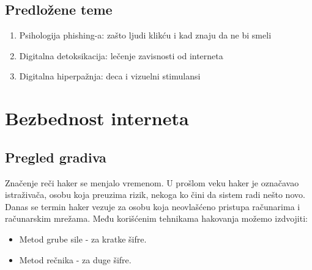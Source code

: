 \documentclass[12pt]{article}
\begin{document}
\subsection{Predložene teme}
\begin{enumerate}
    \item Psihologija phishing-a: zašto ljudi klikću i kad znaju da ne bi smeli
    \item Digitalna detoksikacija: lečenje zavisnosti od interneta
    \item Digitalna hiperpažnja: deca i vizuelni stimulansi 
\end{enumerate}

\section{Bezbednost interneta}

\subsection{Pregled gradiva}
Značenje reči haker se menjalo vremenom. U prošlom veku haker je označavao istraživača, osobu koja preuzima rizik, nekoga ko čini da sistem radi nešto novo. Danas se termin haker vezuje za osobu koja neovlašćeno pristupa računarima i računarskim mrežama.
Među korišćenim tehnikama hakovanja možemo izdvojiti:
\begin{itemize}
    \item Metod grube sile - za kratke šifre.
    \item Metod rečnika - za duge šifre.
\end{itemize}
\end{document}
